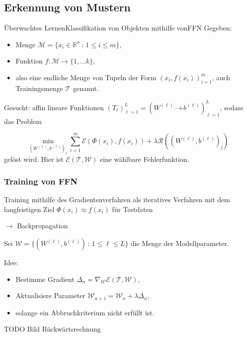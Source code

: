 \documentclass[10pt]{beamer} %
\newcommand{\RR}{\ensuremath{\mathbb{R}}}
\begin{document}
\subsection{Erkennung von Mustern}
\begin{frame}{Überwachtes Lernen}{Klassifikation von Objekten mithilfe vonFFN}
Gegeben: 
\begin{itemize}
   \item Menge $\mathcal{M}=\{x_i \in \RR^n \, : \, 1 \leq i \leq m\}$,
   \item Funktion $f: \mathcal{M} \rightarrow \{1, \ldots k\}$,
   \item also eine endliche Menge von Tupeln der Form $(x_i, f(x_i))_{i=1}^m$, auch Trainingsmenge $\mathcal{T}$ genannt.
\end{itemize} 
\pause
Gesucht: affin lineare Funktionen $(T_{\ell})_{\ell=1}^L=(W^{(\ell)} \cdot + b^{(\ell)})_{\ell=1}^L$, sodass das Problem

\begin{equation*}
   \underset{(W^{(\ell)}, b^{(\ell)})_\ell}{\min} \sum_{i=1}^m \mathcal{E}(\Phi(x_i),f(x_i)) +\lambda \mathcal{R}((W^{(\ell)}, b^{(\ell)})_l)
\end{equation*}
gelöst wird. Hier ist $\mathcal{E}(\mathcal{T},\mathcal{W})$ eine wählbare Fehlerfunktion.
\end{frame}

\begin{frame}
   \frametitle{Training von FFN}
   Training mithilfe des Gradientenverfahren als iteratives Verfahren mit dem langfristigen Ziel $\Phi(x_i) \approx f(x_i)$ für Testdaten 
   
   $\rightarrow$ Backpropagation
   
   Sei $\mathcal{W}=\{(W^{(\ell)},b^{(\ell)}) \, : \, 1 \leq \ell \leq L\}$ die Menge der Modellparameter.

   Idee: 
   \begin{itemize}
      \pause
      \item Bestimme Gradient $\Delta_n=\nabla_{\mathcal{W}} \mathcal{E}(\mathcal{T},\mathcal{W})$,
      \pause
      \item Aktualisiere Parameter $\mathcal{W}_{n+1}= \mathcal{W}_n+ \lambda \Delta_n$,
      \pause
      \item solange ein Abbruchkriterium nicht erfüllt ist.
   \end{itemize} 

\end{frame}

\begin{frame}
   TODO Bild Rückwärtsrechnung
\end{frame}
\end{document}
